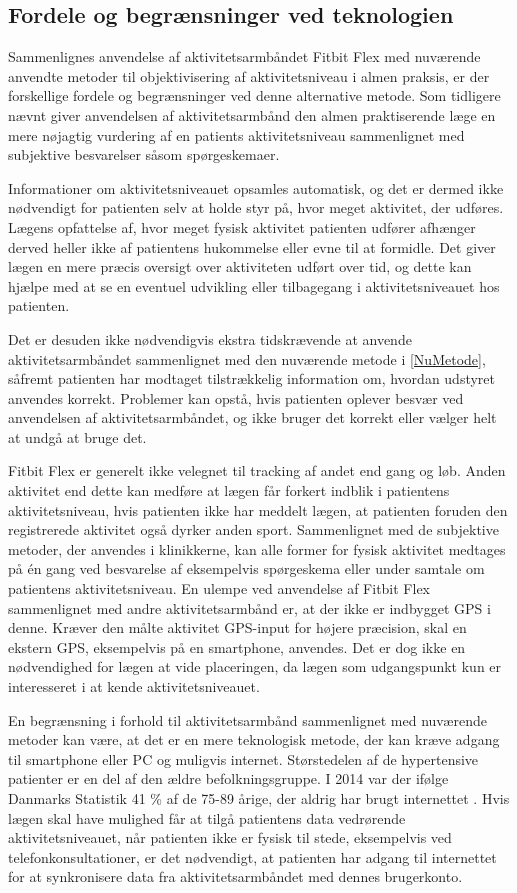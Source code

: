 \subsection{Fordele og begrænsninger ved teknologien}
Sammenlignes anvendelse af aktivitetsarmbåndet Fitbit Flex med nuværende anvendte metoder til objektivisering af aktivitetsniveau i almen praksis, er der forskellige fordele og begrænsninger ved denne alternative metode. Som tidligere nævnt giver anvendelsen af aktivitetsarmbånd den almen praktiserende læge en mere nøjagtig vurdering af en patients aktivitetsniveau sammenlignet med subjektive besvarelser såsom spørgeskemaer.

Informationer om aktivitetsniveauet opsamles automatisk, og det er dermed ikke nødvendigt for patienten selv at holde styr på, hvor meget aktivitet, der udføres. Lægens opfattelse af, hvor meget fysisk aktivitet patienten udfører afhænger derved heller ikke af patientens hukommelse eller evne til at formidle. Det giver lægen en mere præcis oversigt over aktiviteten udført over tid, og dette kan hjælpe med at se en eventuel udvikling eller tilbagegang i aktivitetsniveauet hos patienten. 

Det er desuden ikke nødvendigvis ekstra tidskrævende at anvende aktivitetsarmbåndet sammenlignet med den nuværende metode i \autoref{NuMetode}, såfremt patienten har modtaget tilstrækkelig information om, hvordan udstyret anvendes korrekt. Problemer kan opstå, hvis patienten oplever besvær ved anvendelsen af aktivitetsarmbåndet, og ikke bruger det korrekt eller vælger helt at undgå at bruge det.

Fitbit Flex er generelt ikke velegnet til tracking af andet end gang og løb. Anden aktivitet end dette kan medføre at lægen får forkert indblik i patientens aktivitetsniveau, hvis patienten ikke har meddelt lægen, at patienten foruden den registrerede aktivitet også dyrker anden sport. Sammenlignet med de subjektive metoder, der anvendes i klinikkerne, kan alle former for fysisk aktivitet medtages på én gang ved besvarelse af eksempelvis spørgeskema eller under samtale om patientens aktivitetsniveau.
En ulempe ved anvendelse af Fitbit Flex sammenlignet med andre aktivitetsarmbånd er, at der ikke er indbygget GPS i denne. Kræver den målte aktivitet GPS-input for højere præcision, skal en ekstern GPS, eksempelvis på en smartphone, anvendes. Det er dog ikke en nødvendighed for lægen at vide placeringen, da lægen som udgangspunkt kun er interesseret i at kende aktivitetsniveauet.

En begrænsning i forhold til aktivitetsarmbånd sammenlignet med nuværende metoder kan være, at det er en mere teknologisk metode, der kan kræve adgang til smartphone eller PC og muligvis internet. Størstedelen af de hypertensive patienter er en del af den ældre befolkningsgruppe. I 2014 var der ifølge Danmarks Statistik 41 \% af de 75-89 årige, der aldrig har brugt internettet \citep{dst2014}. Hvis lægen skal have mulighed får at tilgå patientens data vedrørende aktivitetsniveauet, når patienten ikke er fysisk til stede, eksempelvis ved telefonkonsultationer, er det nødvendigt, at patienten har adgang til internettet for at synkronisere data fra aktivitetsarmbåndet med dennes brugerkonto.

